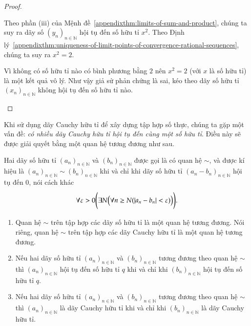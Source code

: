 \begin{proof}
\begin{enumerate}[label={\textbf{Bước \arabic*.}},itemindent=1cm]
              Theo phần (iii) của Mệnh đề~\ref{appendixthm:limits-of-sum-and-product}, chúng ta suy ra dãy số ${(y_{n})}_{n\in\mathbb{N}}$ hội tụ đến số hữu tỉ $x^{2}$. Theo Định lý~\ref{appendixthm:uniqueness-of-limit-points-of-convergence-rational-sequences}, chúng ta suy ra $x^{2} = 2$.

              Vì không có số hữu tỉ nào có bình phương bằng $2$ nên $x^{2} = 2$ (với $x$ là số hữu tỉ) là một kết quả vô lý. Như vậy giả sử phản chứng là sai, kéo theo dãy số hữu tỉ ${(x_{n})}_{n\in\mathbb{N}}$ không hội tụ đến số hữu tỉ nào.
    \end{enumerate}
\end{proof}

Khi sử dụng dãy Cauchy hữu tỉ để xây dựng tập hợp số thực, chúng ta gặp một vấn đề: \textit{có nhiều dãy Cauchy hữu tỉ hội tụ đến cùng một số hữu tỉ}. Điều này sẽ được giải quyết bằng một quan hệ tương đương như sau.

\begin{appendixthm}\label{appendixthm:equivalent-rational-sequences}
    Hai dãy số hữu tỉ ${(a_{n})}_{n\in\mathbb{N}}$ và ${(b_{n})}_{n\in\mathbb{N}}$ được gọi là có quan hệ $\sim$, và được kí hiệu là ${(a_{n})}_{n\in\mathbb{N}} \sim {(b_{n})}_{n\in\mathbb{N}}$ khi và chỉ khi dãy số hữu tỉ ${(a_{n} - b_{n})}_{n\in\mathbb{N}}$ hội tụ đến $0$, nói cách khác
    \[
        \forall\varepsilon > 0\Biggl( \exists N \Bigl( \forall n\geq N ( \left\vert{a_{n} - b_{n}}\right\vert < \varepsilon ) \Bigr) \Biggr).
    \]
    \begin{enumerate}[label={(\roman*)},itemsep=0pt]
        \item Quan hệ $\sim$ trên tập hợp các dãy số hữu tỉ là một quan hệ tương đương. Nói riêng, quan hệ $\sim$ trên tập hợp các dãy Cauchy hữu tỉ là một quan hệ tương đương.
        \item Nếu hai dãy số hữu tỉ ${(a_{n})}_{n\in\mathbb{N}}$ và ${(b_{n})}_{n\in\mathbb{N}}$ tương đương theo quan hệ $\sim$ thì ${(a_{n})}_{n\in\mathbb{N}}$ hội tụ đến số hữu tỉ $q$ khi và chỉ khi ${(b_{n})}_{n\in\mathbb{N}}$ hội tụ đến số hữu tỉ $q$.
        \item Nếu hai dãy số hữu tỉ ${(a_{n})}_{n\in\mathbb{N}}$ và ${(b_{n})}_{n\in\mathbb{N}}$ tương đương theo quan hệ $\sim$ thì ${(a_{n})}_{n\in\mathbb{N}}$ là dãy Cauchy hữu tỉ khi và chỉ khi ${(b_{n})}_{n\in\mathbb{N}}$ là dãy Cauchy hữu tỉ.
    \end{enumerate}
\end{appendixthm}

